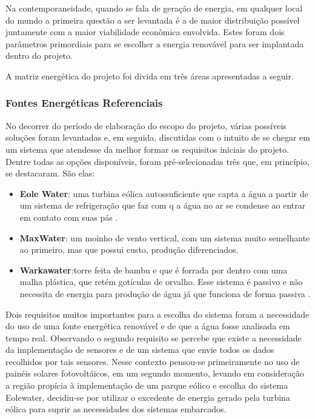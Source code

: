 
Na contemporaneidade, quando se fala de geração de energia, em qualquer local do mundo a primeira questão a ser levantada
é a de maior distribuição possível juntamente com a maior viabilidade econômica envolvida. Estes foram dois parâmetros 
primordiais para se escolher a energia renovável para ser implantada dentro do projeto.

A matriz energética do projeto foi divida em três áreas apresentadas a seguir.

  \subsubsection{Fontes Energéticas Referenciais}
    
    No decorrer do período de elaboração do escopo do projeto, várias possíveis soluções foram levantadas e, em seguida, 
    discutidas com o intuito de se chegar em um sistema que atendesse da melhor formar os requisitos iniciais do projeto.
    Dentre todas as opções disponíveis, foram pré-selecionadas três que, em princípio, se destacaram. São elas:
    
    \begin{itemize}
      \item \textbf{Eole Water}: uma turbina eólica autossuficiente que capta a água a partir de um sistema de refrigeração
	que faz com q a água no ar se condense ao entrar em contato com suas pás \cite{eole}.
     
      \item \textbf{MaxWater}: um moinho de vento vertical, com um sistema muito semelhante ao primeiro, mas que possui custo,
	produção diferenciados.
      
      \item \textbf{Warkawater}:torre feita de bambu e que é forrada por dentro com uma malha plástica, que retém gotículas
	de orvalho. Esse sistema é passivo e não necessita de energia para produção de água já que funciona de forma passiva \cite{warkawater}.
    \end{itemize}
  
    Dois requisitos muitos importantes para a escolha do sistema foram a necessidade do uso de uma fonte energética renovável
    e de que a água fosse analisada em tempo real. Observando o segundo requisito se percebe que existe a necessidade da
    implementação de sensores e de um sistema que envie todos os dados recolhidos por tais sensores. Nesse contexto pensou-se 
    primeiramente no uso de painéis solares fotovoltáicos, em um segundo momento, levando em consideração a região propícia à 
    implementação de um parque eólico e escolha do sistema Eolewater, decidiu-se por utilizar o excedente de energia gerado 
    pela turbina eólica para suprir as necessidades dos sistemas embarcados.
  
